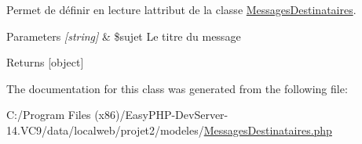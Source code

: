 Permet de définir en lecture l\textquotesingle{}attribut de la classe \hyperlink{class_messages_destinataires}{Messages\+Destinataires}. 


\begin{DoxyParams}{Parameters}
{\em \mbox{[}string\mbox{]}} & \$sujet Le titre du message \\
\hline
\end{DoxyParams}
\begin{DoxyReturn}{Returns}
\mbox{[}object\mbox{]} 
\end{DoxyReturn}


The documentation for this class was generated from the following file\+:\begin{DoxyCompactItemize}
\item 
C\+:/\+Program Files (x86)/\+Easy\+P\+H\+P-\/\+Dev\+Server-\/14.\+V\+C9/data/localweb/projet2/modeles/\hyperlink{_messages_destinataires_8php}{Messages\+Destinataires.\+php}\end{DoxyCompactItemize}
